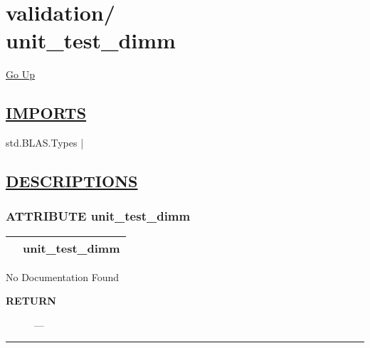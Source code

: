 \chapter*{\color{headfile}
{\large validation\slash\hspace{0pt}}
 \\
unit_test_dimm
}
\hypertarget{ecldoc:toc:validation.unit_test_dimm}{}
\hyperlink{ecldoc:toc:root/validation}{Go Up}

\section*{\underline{\textsf{IMPORTS}}}
\begin{doublespace}
{\large
std.BLAS.Types |
}
\end{doublespace}

\section*{\underline{\textsf{DESCRIPTIONS}}}
\subsection*{\textsf{\colorbox{headtoc}{\color{white} ATTRIBUTE}
unit\_test\_dimm}}

\hypertarget{ecldoc:validation.unit_test_dimm}{}

{\renewcommand{\arraystretch}{1.5}
\begin{tabularx}{\textwidth}{|>{\raggedright\arraybackslash}l|X|}
\hline
\hspace{0pt}\mytexttt{\color{red} } & \textbf{unit\_test\_dimm} \\
\hline
\end{tabularx}
}

\par





No Documentation Found








\par
\begin{description}
\item [\colorbox{tagtype}{\color{white} \textbf{\textsf{RETURN}}}] \textbf{} --- 
\end{description}




\rule{\linewidth}{0.5pt}
